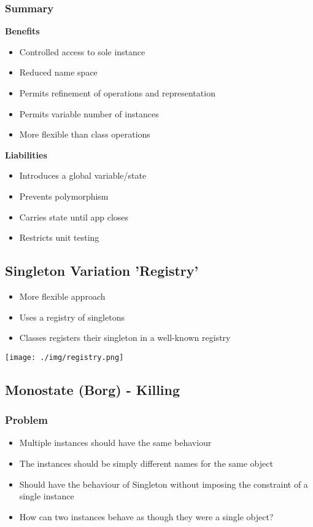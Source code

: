 \subsubsection{Summary}
\textbf{Benefits}
\begin{itemize}
    \item Controlled access to sole instance
    \item Reduced name space
    \item Permits refinement of operations and representation
    \item Permits variable number of instances
    \item More flexible than class operations
\end{itemize}
\textbf{Liabilities}
\begin{itemize}
    \item Introduces a global variable/state
    \item Prevents polymorphism
    \item Carries state until app closes
    \item Restricts unit testing
\end{itemize}

\subsection{Singleton Variation 'Registry'}
\begin{itemize}
    \item More flexible approach
    \item Uses a registry of singletons
    \item Classes registers their singleton in a well-known registry
\end{itemize}
\texttt{[image: ./img/registry.png]}

\subsection{Monostate (Borg) - Killing}
\subsubsection{Problem}
\begin{itemize}
    \item Multiple instances should have the same behaviour
    \item The instances should be simply different names for the same object 
    \item Should have the behaviour of Singleton without imposing the constraint of a single instance
    \item How can two instances behave as though they were a single object?
\end{itemize}
